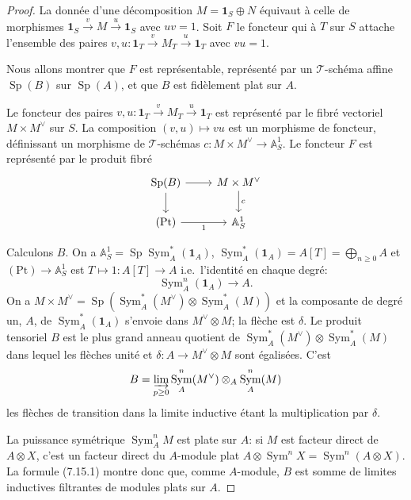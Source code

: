 \documentclass[12pt,a4paper]{article}
\theoremstyle{plain}
\theoremstyle{definition}
\DeclareMathOperator{\Sp}{Sp}
\DeclareMathOperator{\Sym}{Sym}
\begin{document}
\begin{proof}
La donnée d'une décomposition $M = \mathbf{1}_S \oplus N$ équivaut à celle de morphismes $\mathbf{1}_S \xrightarrow{v} M \xrightarrow{u} \mathbf{1}_S$ avec $uv = 1$. Soit $F$ le foncteur qui à $T$ sur $S$ attache l'ensemble des paires $v, u : \mathbf{1}_T \xrightarrow{v} M_T \xrightarrow{u} \mathbf{1}_T$ avec $vu = 1$.

Nous allons montrer que $F$ est représentable, représenté par un $\mathcal{T}$-schéma affine $\Sp(B)$ sur $\Sp(A)$, et que $B$ est fidèlement plat sur $A$.

Le foncteur des paires $v, u : \mathbf{1}_T \xrightarrow{v} M_T \xrightarrow{u} \mathbf{1}_T$ est représenté par le fibré vectoriel $M \times M^\vee$ sur $S$. La composition $(v, u) \mapsto vu$ est un morphisme de foncteur, définissant un morphisme de $\mathcal{T}$-schémas $c : M \times M^\vee \to \mathbb{A}^1_S$. Le foncteur $F$ est représenté par le produit fibré
\[
\begin{tikzcd}
\Sp(B) \arrow[r] \arrow[d] & M \times M^\vee \arrow[d, "c"] \\
(\mathrm{Pt}) \arrow[r, "1"'] & \mathbb{A}^1_S
\end{tikzcd}
\]

Calculons $B$. On a $\mathbb{A}^1_S = \Sp \Sym^*_A(\mathbf{1}_A)$, $\Sym^*_A(\mathbf{1}_A) = A[T] = \bigoplus_{n \geq 0} A$ et $(\mathrm{Pt}) \to \mathbb{A}^1_S$ est $T \mapsto 1 : A[T] \to A$ i.e.~l'identité en chaque degré:
\[
\Sym^n_A(\mathbf{1}_A) \to A.
\]
On a $M \times M^\vee = \Sp(\Sym^*_A(M^\vee) \otimes \Sym^*_A(M))$ et la composante de degré un, $A$, de $\Sym^*_A(\mathbf{1}_A)$ s'envoie dans $M^\vee \otimes M$; la flèche est $\delta$. Le produit tensoriel $B$ est le plus grand anneau quotient de $\Sym^*_A(M^\vee) \otimes \Sym^*_A(M)$ dans lequel les flèches unité et $\delta : A \to M^\vee \otimes M$ sont égalisées. C'est
\begin{equation}\label{eq:7.15.1}
B = \varinjlim_{p \geq 0} \Sym^n_A(M^\vee) \otimes_A \Sym^n_A(M)
\end{equation}
les flèches de transition dans la limite inductive étant la multiplication par $\delta$.

La puissance symétrique $\Sym^n_A M$ est plate sur $A$: si $M$ est facteur direct de $A \otimes X$, c'est un facteur direct du $A$-module plat $A \otimes \Sym^n X = \Sym^n(A \otimes X)$. La formule (7.15.1) montre donc que, comme $A$-module, $B$ est somme de limites inductives filtrantes de modules plats sur $A$.


\end{proof}
\end{document}
